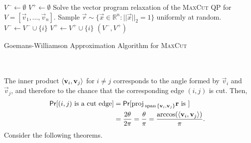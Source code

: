         \begin{algorithm}[H] 
            \begin{algorithmic}[1]
                    \State \(V^-\gets \emptyset\)
                    \State \(V^+\gets \emptyset\)
                    \State Solve the vector program relaxation of the \textsc{MaxCut} QP for \(V=[\vec{v}_1,\ldots,\vec{v}_n]\).
                    \State Sample \(\vec{r}\sim\{\vec{x}\in\mathbb{R}^n:||\vec{x}||_2=1\}\) uniformly at random.
                            \State \(V^-\gets V^-\cup\{i\}\)
                        \Else 
                            \State \(V^+\gets V^+\cup\{i\}\)
                        \EndIf
                    \EndFor
                    \State \Return \((V^-,V^+)\)
                \EndProcedure 
            \end{algorithmic}
            \caption{Goemans-Williamson Approximation Algorithm for \textsc{MaxCut}}
            \label{alg:geomans-williamson}
        \end{algorithm}
        \vphantom
        \\
        \\
        The inner product \(\left\langle \mathbf{v}_i,\mathbf{v}_j\right\rangle\) for \(i\neq j\) corresponds to the angle formed by \(\vec{v}_i\) and \(\vec{v}_j\), and therefore to the chance that the corresponding edge \((i,j)\) is cut. Then,
        \begin{align*}
            \mathsf{Pr}[(i,j)\text{ is a cut edge}]&=\mathsf{Pr}[\text{proj\,}_{\text{span\,}\{\mathbf{v}_i,\mathbf{v}_j\}}\mathbf{r}\text{ is }] \\
            &=\frac{2\theta}{2\pi}=\frac{\theta}{\pi}=\frac{\arccos(\left\langle \mathbf{v}_i,\mathbf{v}_j\right\rangle)}{\pi}.
        \end{align*}
        Consider the following theorems.
